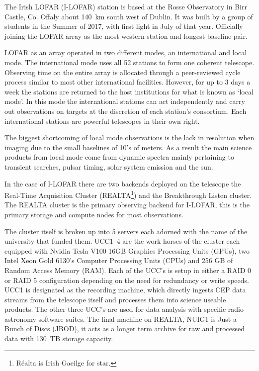 The Irish LOFAR (I-LOFAR) station is based at the Rosse Observatory in Birr Castle, Co. Offaly about 140~km south west of Dublin. It was built by a group of students in the Summer of 2017, with first light in July of that year. Officially joining the LOFAR array as the most western station and longest baseline pair. 

LOFAR as an array operated in two different modes, an international and local mode. The international mode uses all 52 stations to form one coherent telescope. Observing time on the entire array is allocated through a peer-reviewed cycle process similar to most other international facilities. However, for up to 3 days a week the stations are returned to the host institutions for what is known as `local mode'. In this mode the international stations can act independently and carry out observations on targets at the discretion of each station's consortium. Each international stations are powerful telescopes in their own right. 

The biggest shortcoming of local mode observations is the lack in resolution when imaging due to the small baselines of 10's of meters. As a result the main science products from local mode come from dynamic spectra mainly pertaining to transient searches, pulsar timing, solar system emission and the sun.  

In the case of I-LOFAR there are two backends deployed on the telescope the Real-Time Acquisition Cluster (REALTA\footnote{Réalta is Irish Gaeilge for star.}) and the Breakthrough Listen cluster. The REALTA cluster is the primary observing backend for I-LOFAR, this is the primary storage and compute nodes for most observations.  

The cluster itself is broken up into 5 servers each adorned with the name of the university that funded them. UCC1--4 are the work horses of the cluster each equipped with Nvidia Tesla V100 16GB Graphics Processing Units (GPUs), two Intel Xeon Gold 6130's Computer Processing Units (CPUs) and 256 GB of Random Access Memory (RAM). Each of the UCC's is setup in either a RAID 0 or RAID 5 configuration depending on the need for redundancy or write speeds. UCC1 is designated as the recording machine, which directly ingests CEP data streams from the telescope itself and processes them into science useable products. The other three UCC's are used for data analysis with specific radio astronomy software suites. The final machine on REALTA, NUIG1 is Just a Bunch of Discs (JBOD), it acts as a longer term archive for raw and processed data with 130~TB storage capacity. 

